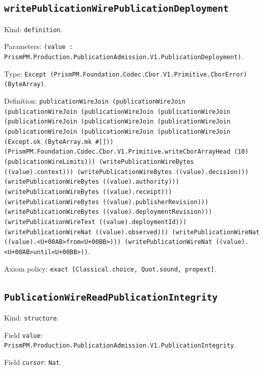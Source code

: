 \documentclass[11pt]{article}
\begin{document}
\subsection*{\texttt{writePublicationWirePublicationDeployment}}
\noindent Kind: \texttt{definition}.\par
\noindent Parameters: \texttt{(value : PrismPM.Production.PublicationAdmission.V1.PublicationDeployment)}.\par
\noindent Type: \texttt{Except (PrismPM.Foundation.Codec.Cbor.V1.Primitive.CborError) (ByteArray)}.\par
\noindent Definition: \texttt{publicationWireJoin (publicationWireJoin (publicationWireJoin (publicationWireJoin (publicationWireJoin (publicationWireJoin (publicationWireJoin (publicationWireJoin (publicationWireJoin (publicationWireJoin (publicationWireJoin (Except.ok (ByteArray.mk \#[])) (PrismPM.Foundation.Codec.Cbor.V1.Primitive.writeCborArrayHead (10) (publicationWireLimits))) (writePublicationWireBytes ((value).context))) (writePublicationWireBytes ((value).decision))) (writePublicationWireBytes ((value).authority))) (writePublicationWireBytes ((value).receipt))) (writePublicationWireBytes ((value).publisherRevision))) (writePublicationWireBytes ((value).deploymentRevision))) (writePublicationWireText ((value).deploymentId))) (writePublicationWireNat ((value).observed))) (writePublicationWireNat ((value).<U+00AB>from<U+00BB>))) (writePublicationWireNat ((value).<U+00AB>until<U+00BB>))}.\par
\noindent Axiom policy: \texttt{exact [Classical.choice, Quot.sound, propext]}.\par
\subsection*{\texttt{PublicationWireReadPublicationIntegrity}}
\noindent Kind: \texttt{structure}.\par
\noindent Field \texttt{value}: \texttt{PrismPM.Production.PublicationAdmission.V1.PublicationIntegrity}.\par
\noindent Field \texttt{cursor}: \texttt{Nat}.\par
\end{document}
